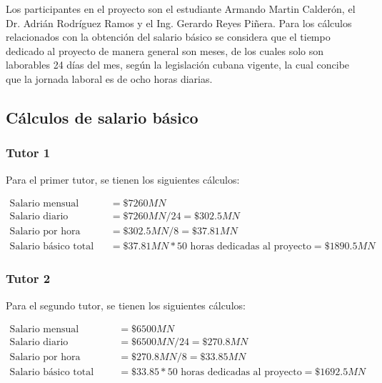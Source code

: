 Los participantes en el proyecto son el estudiante Armando Martin Calderón, el Dr. Adrián Rodríguez Ramos y el Ing. Gerardo Reyes Piñera. Para los cálculos relacionados con la obtención del salario básico se considera que el tiempo dedicado al proyecto de manera general son meses, de los cuales solo son laborables 24 días del mes, según la legislación cubana vigente, la cual concibe que la jornada laboral es de ocho horas diarias.

\subsection{Cálculos de salario básico}

\subsubsection{Tutor 1}

Para el primer tutor, se tienen los siguientes cálculos:

\begin{align}
    \label{eq:tutor1_salary}
    \text{Salario mensual}          & = \$7260MN                                                        \\
    \text{Salario diario}           & = \$7260MN / 24 = \$302.5MN                                       \\
    \text{Salario por hora laboral} & = \$302.5MN / 8 = \$37.81MN                                       \\
    \text{Salario básico total}     & = \$37.81MN * 50 \text{ horas dedicadas al proyecto} = \$1890.5MN
\end{align}

\subsubsection{Tutor 2}

Para el segundo tutor, se tienen los siguientes cálculos:

\begin{align}
    \label{eq:tutor2_salary}
    \text{Salario mensual}          & = \$6500MN                                                      \\
    \text{Salario diario}           & = \$6500MN / 24 = \$270.8MN                                     \\
    \text{Salario por hora laboral} & = \$270.8MN / 8 = \$33.85MN                                     \\
    \text{Salario básico total}     & = \$33.85 * 50 \text{ horas dedicadas al proyecto} = \$1692.5MN
\end{align}

